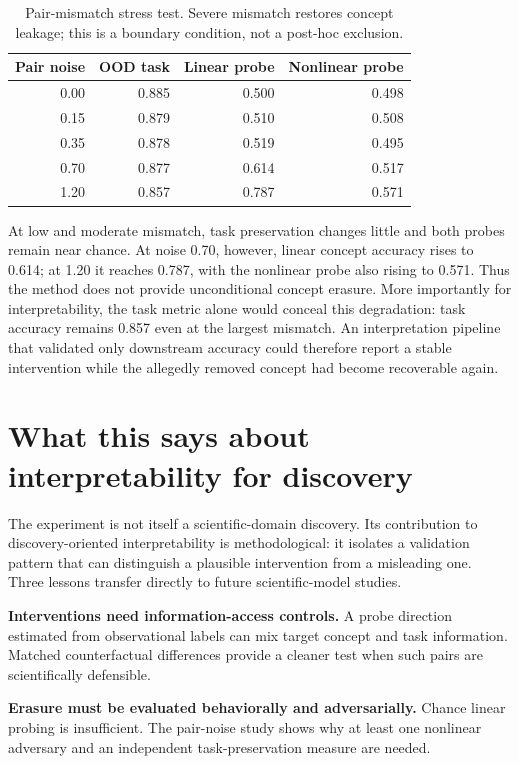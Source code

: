\documentclass{article}
\begin{document}
\begin{table}[t]
\centering
\caption{Pair-mismatch stress test. Severe mismatch restores concept leakage; this is a boundary condition, not a post-hoc exclusion.}
\small
\begin{tabular}{rrrr}
\toprule
Pair noise & OOD task & Linear probe & Nonlinear probe\\
\midrule
0.00 & 0.885 & 0.500 & 0.498\\
0.15 & 0.879 & 0.510 & 0.508\\
0.35 & 0.878 & 0.519 & 0.495\\
0.70 & 0.877 & 0.614 & 0.517\\
1.20 & 0.857 & 0.787 & 0.571\\
\bottomrule
\end{tabular}
\label{tab:noise}
\end{table}

At low and moderate mismatch, task preservation changes little and both probes remain near chance. At noise 0.70, however, linear concept accuracy rises to 0.614; at 1.20 it reaches 0.787, with the nonlinear probe also rising to 0.571. Thus the method does not provide unconditional concept erasure. More importantly for interpretability, the task metric alone would conceal this degradation: task accuracy remains 0.857 even at the largest mismatch. An interpretation pipeline that validated only downstream accuracy could therefore report a stable intervention while the allegedly removed concept had become recoverable again.

\section{What this says about interpretability for discovery}
The experiment is not itself a scientific-domain discovery. Its contribution to discovery-oriented interpretability is methodological: it isolates a validation pattern that can distinguish a plausible intervention from a misleading one. Three lessons transfer directly to future scientific-model studies.

\textbf{Interventions need information-access controls.} A probe direction estimated from observational labels can mix target concept and task information. Matched counterfactual differences provide a cleaner test when such pairs are scientifically defensible.

\textbf{Erasure must be evaluated behaviorally and adversarially.} Chance linear probing is insufficient. The pair-noise study shows why at least one nonlinear adversary and an independent task-preservation measure are needed.
\end{document}
